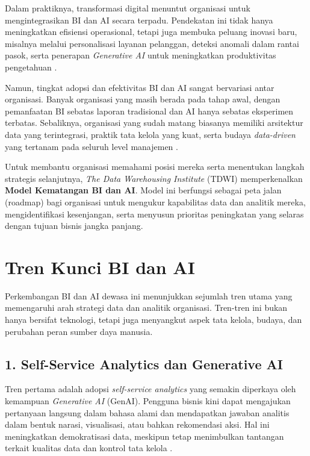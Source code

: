 Dalam praktiknya, transformasi digital menuntut organisasi untuk mengintegrasikan BI dan AI secara terpadu. 
Pendekatan ini tidak hanya meningkatkan efisiensi operasional, tetapi juga membuka peluang inovasi baru, 
misalnya melalui personalisasi layanan pelanggan, deteksi anomali dalam rantai pasok, serta penerapan \textit{Generative AI} 
untuk meningkatkan produktivitas pengetahuan \cite{fernandez2020, lim2023adoption}.  

Namun, tingkat adopsi dan efektivitas BI dan AI sangat bervariasi antar organisasi. Banyak organisasi yang masih berada 
pada tahap awal, dengan pemanfaatan BI sebatas laporan tradisional dan AI hanya sebatas eksperimen terbatas. 
Sebaliknya, organisasi yang sudah matang biasanya memiliki arsitektur data yang terintegrasi, praktik tata kelola yang 
kuat, serta budaya \textit{data-driven} yang tertanam pada seluruh level manajemen \cite{liao2021business, mukherjee2022comparative}.  

Untuk membantu organisasi memahami posisi mereka serta menentukan langkah strategis selanjutnya, 
\textit{The Data Warehousing Institute} (TDWI) memperkenalkan \textbf{Model Kematangan BI dan AI}. 
Model ini berfungsi sebagai peta jalan (roadmap) bagi organisasi untuk mengukur kapabilitas data dan analitik mereka, 
mengidentifikasi kesenjangan, serta menyusun prioritas peningkatan yang selaras dengan tujuan bisnis jangka panjang.
\section{Tren Kunci BI dan AI}

Perkembangan BI dan AI dewasa ini menunjukkan sejumlah tren utama yang memengaruhi arah strategi data dan analitik 
organisasi. Tren-tren ini bukan hanya bersifat teknologi, tetapi juga menyangkut aspek tata kelola, budaya, dan 
perubahan peran sumber daya manusia.

\subsection*{1. Self-Service Analytics dan Generative AI}
Tren pertama adalah adopsi \textit{self-service analytics} yang semakin diperkaya oleh kemampuan 
\textit{Generative AI} (GenAI). Pengguna bisnis kini dapat mengajukan pertanyaan langsung dalam bahasa alami 
dan mendapatkan jawaban analitis dalam bentuk narasi, visualisasi, atau bahkan rekomendasi aksi. Hal ini 
meningkatkan demokratisasi data, meskipun tetap menimbulkan tantangan terkait kualitas data dan kontrol tata kelola 
\cite{imhoff2014ssbi, chen2021aibi}.  

